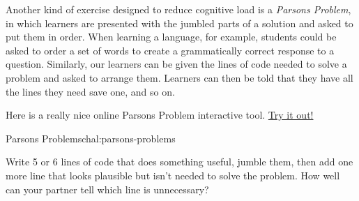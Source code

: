 
Another kind of exercise designed to reduce cognitive load is a
\emph{Parsons Problem}, in which learners are presented with the jumbled
parts of a solution and asked to put them in order. When learning a
language, for example, students could be asked to order a set of words
to create a grammatically correct response to a question. Similarly, our
learners can be given the lines of code needed to solve a problem and
asked to arrange them. Learners can then be told that they have all the
lines they need save one, and so on.

Here is a really nice online Parsons Problem interactive tool.
\href{http://runestoneinteractive.org/LearningAtScale/parsons.html}{Try
it out!}

\begin{challenge}{Parsons Problems}{chal:parsons-problems}

Write 5 or 6 lines of code that does something useful, jumble them, then
add one more line that looks plausible but isn't needed to solve the
problem. How well can your partner tell which line is unnecessary?
\end{challenge}
